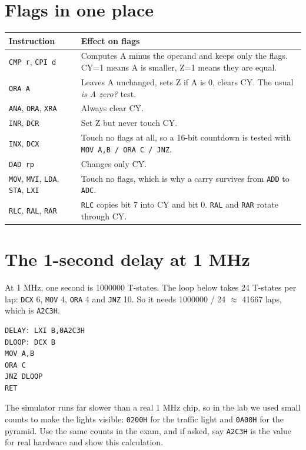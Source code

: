 \documentclass[11pt,a4paper]{article}
\newcommand{\code}[1]{\texttt{#1}}
\begin{document}
\section*{Flags in one place}
\small
\begin{tabularx}{\textwidth}{@{}>{\raggedright\arraybackslash}p{4.4cm} L@{}}
\toprule
Instruction & Effect on flags\\
\midrule
\code{CMP r}, \code{CPI d} & Computes A minus the operand and keeps only the flags. CY=1 means A is smaller, Z=1 means they are equal.\\
\code{ORA A} & Leaves A unchanged, sets Z if A is 0, clears CY. The usual \emph{is A zero?} test.\\
\code{ANA}, \code{ORA}, \code{XRA} & Always clear CY.\\
\code{INR}, \code{DCR} & Set Z but never touch CY.\\
\code{INX}, \code{DCX} & Touch no flags at all, so a 16-bit countdown is tested with \code{MOV A,B / ORA C / JNZ}.\\
\code{DAD rp} & Changes only CY.\\
\code{MOV}, \code{MVI}, \code{LDA}, \code{STA}, \code{LXI} & Touch no flags, which is why a carry survives from \code{ADD} to \code{ADC}.\\
\code{RLC}, \code{RAL}, \code{RAR} & \code{RLC} copies bit 7 into CY and bit 0. \code{RAL} and \code{RAR} rotate through CY.\\
\bottomrule
\end{tabularx}
\normalsize

\section*{The 1-second delay at 1 MHz}
At 1 MHz, one second is \num{1000000} T-states. The loop below takes 24 T-states per lap: \code{DCX} 6, \code{MOV} 4, \code{ORA} 4 and \code{JNZ} 10. So it needs \num{1000000} / 24 $\approx$ \num{41667} laps, which is \code{A2C3H}.

\begin{minipage}[t]{0.3\textwidth}\vspace{0pt}
\begin{lstlisting}
DELAY: LXI B,0A2C3H
DLOOP: DCX B
MOV A,B
ORA C
JNZ DLOOP
RET
\end{lstlisting}
\end{minipage}\hfill
\begin{minipage}[t]{0.66\textwidth}\vspace{0pt}
The simulator runs far slower than a real 1 MHz chip, so in the lab we used small counts to make the lights visible: \code{0200H} for the traffic light and \code{0A00H} for the pyramid. Use the same counts in the exam, and if asked, say \code{A2C3H} is the value for real hardware and show this calculation.
\end{minipage}
\end{document}
